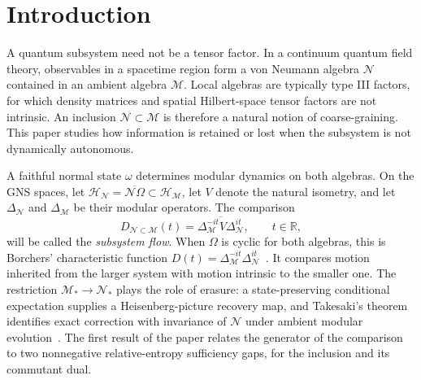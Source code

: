 \documentclass[a4paper,11pt]{article}
\theoremstyle{definition}
\newcommand{\mN}{\mathcal{N}}
\newcommand{\mH}{\mathcal{H}}
\newcommand{\mM}{\mathcal{M}}
\begin{document}

\maketitle
\section{Introduction}\label{sec:intro}

A quantum subsystem need not be a tensor factor. In a continuum quantum field theory, observables in a spacetime region form a von Neumann algebra $\mN$ contained in an ambient algebra $\mM$. Local algebras are typically type III factors, for which density matrices and spatial Hilbert-space tensor factors are not intrinsic. An inclusion $\mN\subset\mM$ is therefore a natural notion of coarse-graining. This paper studies how information is retained or lost when the subsystem is not dynamically autonomous.

A faithful normal state $\omega$ determines modular dynamics on both algebras. On the GNS spaces, let $\mH_{\mN}=\overline{\mN\Omega}\subset\mH_{\mM}$, let $V$ denote the natural isometry, and let $\Delta_{\mN}$ and $\Delta_{\mM}$ be their modular operators. The comparison
\begin{equation}
 D_{\mN\subset\mM}(t)
 =\overline{\Delta_{\mM}^{-it}V\Delta_{\mN}^{it}},
 \qquad t\in\mathbb R,
 \label{eq:intro-compressed-flow}
\end{equation}
will be called the \emph{subsystem flow}. When $\Omega$ is cyclic for both algebras, this is Borchers' characteristic function $D(t)=\Delta_{\mM}^{-it}\Delta_{\mN}^{it}$~\cite{revolutionizing}. It compares motion inherited from the larger system with motion intrinsic to the smaller one. The restriction $\mM_*\to\mN_*$ plays the role of erasure: a state-preserving conditional expectation supplies a Heisenberg-picture recovery map, and Takesaki's theorem identifies exact correction with invariance of $\mN$ under ambient modular evolution~\cite{Takesaki1972,Petz1986,Faulkner2020}. The first result of the paper relates the generator of the comparison to two nonnegative relative-entropy sufficiency gaps, for the inclusion and its commutant dual.
\end{document}
